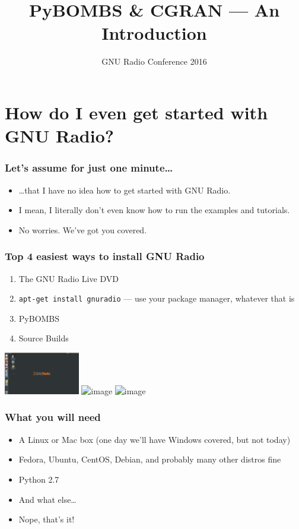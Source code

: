 \documentclass{beamer}
\title{PyBOMBS \& CGRAN --- An Introduction}
\institute{Martin Braun}
\date{GNU Radio Conference 2016}
\begin{document}
\frame{\titlepage}

\section{How do I even get started with GNU Radio?}
\begin{frame}
  \frametitle{Let's assume for just one minute\ldots}
  \begin{itemize}
    \item \ldots{}that I have no idea how to get started with GNU Radio.
    \item<2-> I mean, I literally don't even know how to run the examples and tutorials.
    \item<3-> No worries. We've got you covered.
  \end{itemize}
\end{frame}

\begin{frame}
  \frametitle{Top 4 easiest ways to install GNU Radio}
  \begin{enumerate}
    \item The GNU Radio Live DVD
    \item<2-> \texttt{apt-get install gnuradio} --- use your package manager, whatever that is
    \item<3-> PyBOMBS
    \item<4-> Source Builds
  \end{enumerate}
    \hspace{3em}
    \includegraphics[height=5em]{grlivedvd}
    \hspace{1em}
    \includegraphics<3->[height=5em]{pybombs_logo}
    \hspace{1em}
    \includegraphics<4->[height=5em]{srcbuild}
\end{frame}


\begin{frame}
  \frametitle{What you will need}
  \begin{itemize}
    \item A Linux or Mac box (one day we'll have Windows covered, but not today)
    \item Fedora, Ubuntu, CentOS, Debian, and probably many other distros fine
    \item Python 2.7
    \item<2-> And what else\ldots
    \item<3-> Nope, that's it!
  \end{itemize}
\end{frame}
\end{document}
